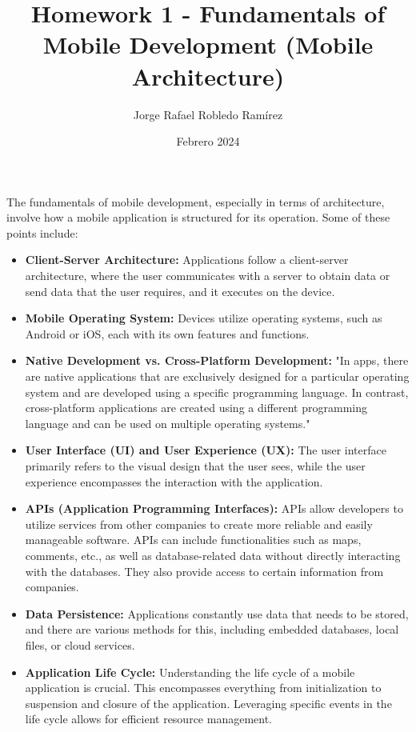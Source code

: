 \documentclass{article}
\title{Homework 1 - Fundamentals of Mobile Development (Mobile Architecture)}
\author{Jorge Rafael Robledo Ramírez}
\date{Febrero 2024}
\begin{document}
\maketitle

The fundamentals of mobile development, especially in terms of architecture, involve how a mobile application is structured for its operation. Some of these points include:

\begin{itemize}
    \item \textbf{Client-Server Architecture:} Applications follow a client-server architecture, where the user communicates with a server to obtain data or send data that the user requires, and it executes on the device.

    \item \textbf{Mobile Operating System:} Devices utilize operating systems, such as Android or iOS, each with its own features and functions.

    \item \textbf{Native Development vs. Cross-Platform Development:} "In apps, there are native applications that are exclusively designed for a particular operating system and are developed using a specific programming language. In contrast, cross-platform applications are created using a different programming language and can be used on multiple operating systems."

    \item \textbf{User Interface (UI) and User Experience (UX):} The user interface primarily refers to the visual design that the user sees, while the user experience encompasses the interaction with the application.

    \item \textbf{APIs (Application Programming Interfaces):} APIs allow developers to utilize services from other companies to create more reliable and easily manageable software. APIs can include functionalities such as maps, comments, etc., as well as database-related data without directly interacting with the databases. They also provide access to certain information from companies.

    \item \textbf{Data Persistence:} Applications constantly use data that needs to be stored, and there are various methods for this, including embedded databases, local files, or cloud services.

    \item \textbf{Application Life Cycle:} Understanding the life cycle of a mobile application is crucial. This encompasses everything from initialization to suspension and closure of the application. Leveraging specific events in the life cycle allows for efficient resource management.


\end{itemize}
\end{document}
